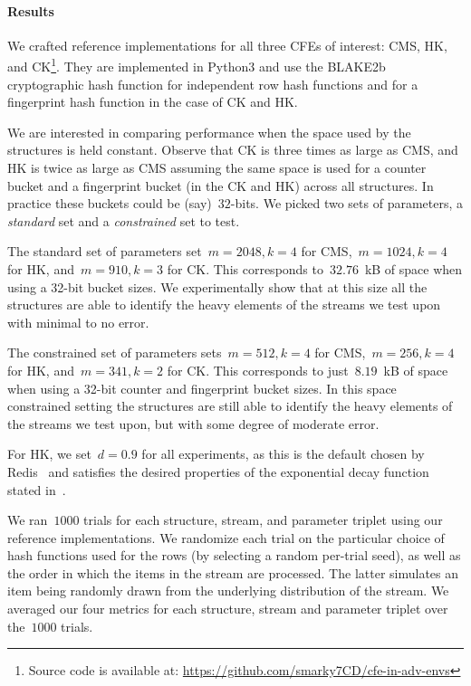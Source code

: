 \paragraph{Results} We crafted reference implementations for all three CFEs of interest: CMS, HK, and CK\footnote{Source code is available at: \url{https://github.com/smarky7CD/cfe-in-adv-envs}}. They are implemented in Python3 and use the BLAKE2b cryptographic hash function %
for independent row hash functions and for a fingerprint hash function in the case of CK and HK. %

We are interested in comparing performance when the space used by the structures is held constant. Observe that CK is three times as large as  CMS, and HK is twice as large as CMS assuming the same space is used for a counter bucket and a fingerprint bucket (in the CK and HK) across all structures. In practice these buckets could be (say)~$32$-bits. We picked two sets of parameters, a \emph{standard} set and a \emph{constrained} set to test.

The standard set of parameters set~$m=2048,k=4$ for CMS,~$m=1024,k=4$ for HK, and~$m=910,k=3$ for CK. This corresponds to~$32.76$~kB of space when using a 32-bit bucket sizes. We experimentally show that at this size all the structures are able to identify the heavy elements of the streams we test upon with minimal to no error. 

The constrained set of parameters sets~$m=512,k=4$ for CMS,~$m=256,k=4$ for HK, and~$m=341,k=2$ for CK. This corresponds to just~$8.19$~kB of space when using a 32-bit counter and fingerprint bucket sizes. In this space constrained setting the structures are still able to identify the heavy elements of the streams we test upon, but with some degree of moderate error. 

For HK, we set~$d=0.9$ for all experiments, as this is the default chosen by Redis~\cite{redisbloom} and satisfies the desired properties of the exponential decay function stated in~\cite{yang2019heavykeeper}. 

We ran~$1000$ trials for each structure, stream, and parameter triplet using our reference implementations. We randomize each trial on the particular choice of hash functions used for the rows (by selecting a random per-trial seed), as well as the order in which the items in the stream are processed. The latter simulates an item being randomly drawn from the underlying distribution of the stream. We averaged our four metrics for each structure, stream and parameter triplet over the~$1000$ trials. 

